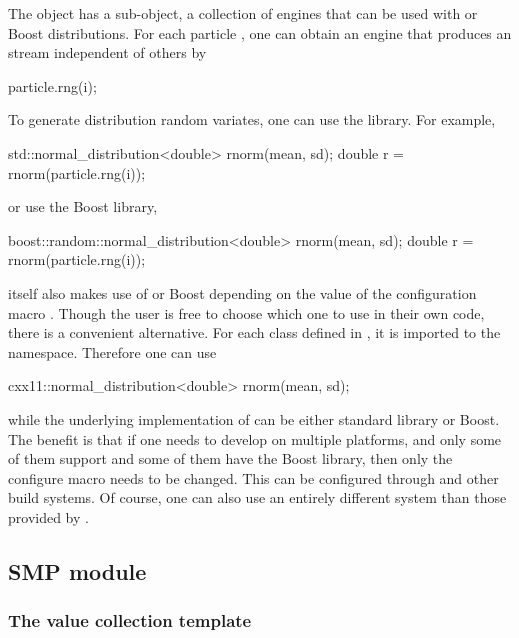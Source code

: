 The  object has a sub-object, a collection of \rng engines
that can be used with \cppoo{}  or Boost distributions. For
each particle , one can obtain an engine that produces an \rng stream
independent of others by
\begin{cppcode}
particle.rng(i);
\end{cppcode}
To generate distribution random variates, one can use the
\cppoo{}  library. For example,
\begin{cppcode}
std::normal_distribution<double> rnorm(mean, sd);
double r = rnorm(particle.rng(i));
\end{cppcode}
or use the Boost library,
\begin{cppcode}
boost::random::normal_distribution<double> rnorm(mean, sd);
double r = rnorm(particle.rng(i));
\end{cppcode}
\vsmc itself also makes use of \cppoo{}  or Boost depending
on the value of the configuration macro .
Though the user is free to choose which one to use in their own code, there is
a convenient alternative. For each class defined in \cppoo{} ,
it is imported to the  namespace. Therefore one can use
\begin{cppcode}
cxx11::normal_distribution<double> rnorm(mean, sd);
\end{cppcode}
while the underlying implementation of  can be
either \cppoo standard library or Boost. The benefit is that if one needs to
develop on multiple platforms, and only some of them support \cppoo and some
of them have the Boost library, then only the configure macro
 needs to be changed. This can be configured
through \cmake and other build systems. Of course, one can also use an
entirely different \rng system than those provided by \vsmc.

\subsection{SMP module}
\label{sub:SMP module}

\subsubsection{The value collection template}
\label{ssub:The value collection template}

